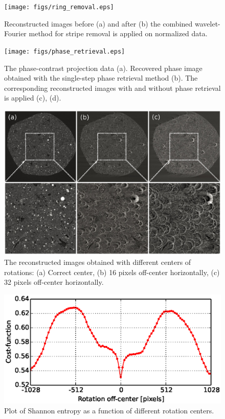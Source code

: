 \documentclass[pdf]{iucr}              %
\begin{document}
\begin{figure}
\centering
\texttt{[image: figs/ring\_removal.eps]}
\caption{Reconstructed images before (a) and after (b) the combined wavelet-Fourier method for stripe removal is applied on normalized data.}
\label{fig:ProcessRing}
\end{figure}

\begin{figure}
\centering
\texttt{[image: figs/phase\_retrieval.eps]}
\caption{The phase-contrast projection data (a). Recovered phase image obtained with the single-step phase retrieval method (b). The corresponding reconstructed images with and without phase retrieval is applied (c), (d).}
\label{fig:ProcessPhase}
\end{figure}

\begin{figure}
\centering
\includegraphics[width=\textwidth]{figs/center_optimize.eps}
\caption{The reconstructed images obtained with different centers of rotations: (a) Correct center, (b) 16 pixels  off-center horizontally, (c) 32 pixels off-center horizontally.}
\label{fig:OptimizeCenter1}
\end{figure}

\begin{figure}
\centering
\includegraphics[width=\textwidth]{figs/center_costfunc.eps}
\caption{Plot of Shannon entropy as a function of different rotation centers. }
\label{fig:OptimizeCenter2}
\end{figure}

 
\end{document}
